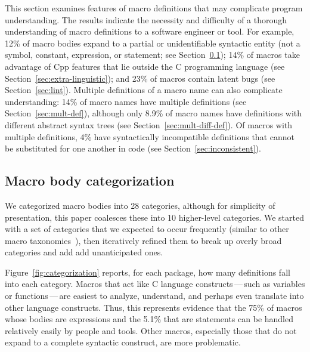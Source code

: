 \documentclass[10pt]{article}
\begin{document}
This section examines features of macro definitions that may complicate
program understanding.  The results indicate the necessity and difficulty
of a thorough understanding of macro definitions to a software engineer or
tool.  For example, 12\% of macro bodies expand to a partial or
unidentifiable syntactic entity (not a symbol, constant, expression, or
statement; see Section~\ref{sec:categorization}); 14\% of macros take
advantage of Cpp features that lie outside the C programming language (see
Section~\ref{sec:extra-linguistic}); and 23\% of macros contain latent bugs
(see Section~\ref{sec:lint}).  Multiple definitions of a macro name can
also complicate understanding:  14\% of macro names have multiple
definitions (see Section~\ref{sec:mult-def}), although only 8.9\% of macro
names have definitions with different abstract syntax trees (see
Section~\ref{sec:mult-diff-def}).  Of macros with multiple definitions, 4\%
have syntactically incompatible definitions that cannot be substituted for
one another in code (see Section~\ref{sec:inconsistent}).


\subsection{Macro body categorization}
\label{sec:categorization}

We categorized macro bodies into 28 categories, although for simplicity of
presentation, this paper coalesces these into 10 higher-level categories.
We started with a set of categories that we expected to occur frequently
(similar to other macro
taxonomies~\cite{Stroustrup-DesignEvolution,Carroll95}), then iteratively
refined them to break up overly broad categories and add add unanticipated ones.


Figure~\ref{fig:categorization} reports, for each package, how many
definitions fall into each category.  Macros that
act like C language constructs\,---\,such as variables or
functions\,---\,are easiest to analyze, understand, and perhaps even
translate into other language constructs.  Thus, this represents evidence
that the 75\% of macros whose bodies are expressions and the 5.1\% that are
statements can be handled relatively easily by people and tools.  Other
macros, especially those that do not expand to a complete syntactic
construct, are more problematic.
\end{document}
